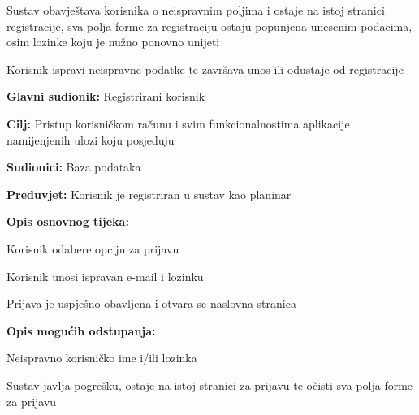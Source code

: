 \begin{packed_item}
\begin{packed_item}
					\item[] \begin{packed_enum}
						
						\item $ $Sustav obavještava korisnika o neispravnim poljima i ostaje na istoj stranici registracije, sva polja forme za registraciju ostaju popunjena unesenim podacima, osim lozinke koju je nužno ponovno unijeti$ $
						\item $ $Korisnik ispravi neispravne podatke te završava unos ili odustaje od registracije$ $
						
					\end{packed_enum}
				\end{packed_item}
			\end{packed_item}
		
			\noindent {}
		\begin{packed_item}
			
			\item \textbf{Glavni sudionik: }$ $Registrirani korisnik $ $
			\item  \textbf{Cilj:} $ $Pristup korisničkom računu i svim funkcionalnostima aplikacije namijenjenih ulozi koju posjeduju$ $
			\item  \textbf{Sudionici:} $ $Baza podataka$ $
			\item  \textbf{Preduvjet:} $ $Korisnik je registriran u sustav kao planinar$ $
			\item  \textbf{Opis osnovnog tijeka:}
			
			\item[] \begin{packed_enum}
				
				\item $ $Korisnik odabere opciju za prijavu$ $
				\item $ $Korisnik unosi ispravan e-mail i lozinku$ $
				\item $ $Prijava je uspješno obavljena i otvara se naslovna stranica$ $
				
			\end{packed_enum}
			
			\item  \textbf{Opis mogućih odstupanja:}
			
			\item[] \begin{packed_item}
				
				\item[3.a] $ $Neispravno korisničko ime i/ili lozinka $ $
				\item[] \begin{packed_enum}
					
					\item $ $Sustav javlja pogrešku, ostaje na istoj stranici za prijavu te očisti sva polja forme za prijavu$ $
				\end{packed_enum}
			\end{packed_item}
		\end{packed_item}
	
